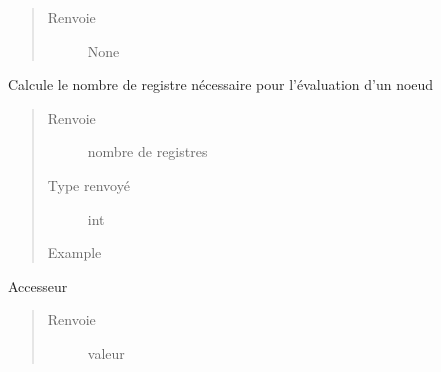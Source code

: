 \documentclass[letterpaper,10pt,french]{sphinxmanual}
\begin{document}
\begin{fulllineitems}
\begin{fulllineitems}
\begin{quote}
\begin{description}
\item[{Renvoie}] \leavevmode
None

\end{description}\end{quote}

\end{fulllineitems}


\begin{fulllineitems}
\label{\detokenize{arithmeticexpressionnodes:arithmeticexpressionnodes.ValueNode.getRegisterCost}}
Calcule le nombre de registre nécessaire pour l’évaluation d’un noeud
\begin{quote}\begin{description}
\item[{Renvoie}] \leavevmode
nombre de registres

\item[{Type renvoyé}] \leavevmode
int

\item[{Example}] \leavevmode
\begin{sphinxVerbatim}[commandchars=\\\{\}]
  
\end{sphinxVerbatim}

\end{description}\end{quote}

\end{fulllineitems}


\begin{fulllineitems}
\label{\detokenize{arithmeticexpressionnodes:arithmeticexpressionnodes.ValueNode.value}}
Accesseur
\begin{quote}\begin{description}
\item[{Renvoie}] \leavevmode
valeur


\end{description}
\end{quote}
\end{fulllineitems}
\end{fulllineitems}
\end{document}
